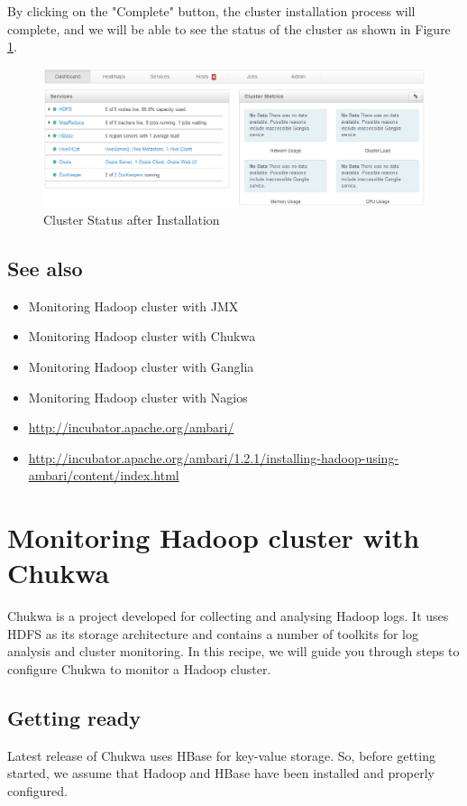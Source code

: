 By clicking on the "Complete" button, the cluster installation process will complete, and we will be able to see the status of the cluster as shown in Figure \ref{fig:cluster.status}.
\begin{figure}[ht]
  \centering
  \includegraphics[width=.8\textwidth]{figs/5163os_06_27.png}
  \caption{Cluster Status after Installation}\label{fig:cluster.status}
\end{figure} 
\subsection*{See also}
\begin{itemize}
  \item Monitoring Hadoop cluster with JMX
  \item Monitoring Hadoop cluster with Chukwa 
  \item Monitoring Hadoop cluster with Ganglia
  \item Monitoring Hadoop cluster with Nagios
  \item \url{http://incubator.apache.org/ambari/}
  \item \url{http://incubator.apache.org/ambari/1.2.1/installing-hadoop-using-ambari/content/index.html}
\end{itemize}

\section{Monitoring Hadoop cluster with Chukwa}
Chukwa is a project developed for collecting and analysing Hadoop logs. It uses HDFS as its storage architecture and contains a number of toolkits for log analysis and cluster monitoring. In this recipe, we will guide you through steps to configure Chukwa to monitor a Hadoop cluster.
\subsection*{Getting ready}
Latest release of Chukwa uses HBase for key-value storage. So, before getting started, we assume that Hadoop and HBase have been installed and properly configured.

